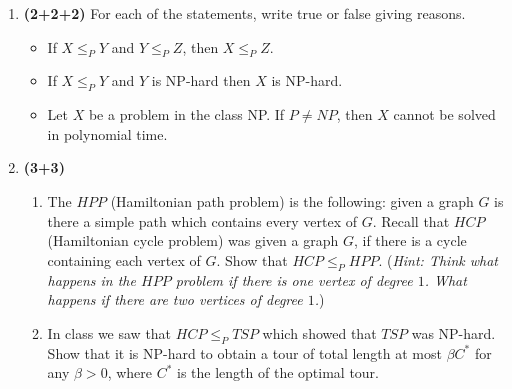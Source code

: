 \documentclass[10pt]{article}
\begin{document}
\begin{enumerate}
\item {\bf (2+2+2)}
For each of the statements, write true or false giving reasons.
\begin{itemize}
\item If $X\le_P Y$ and $Y\le_P Z$, then $X\le_P Z$. 
\item If $X \le_P Y$ and $Y$ is NP-hard then $X$ is NP-hard.
\item Let $X$ be a problem in the class NP. If $P\neq NP$, then $X$ cannot be solved in polynomial time.
\end{itemize}

\item {\bf (3+3)}
\begin{enumerate}
\item The $HPP$ (Hamiltonian path problem) is the following: given a graph $G$ is there a simple path which contains every vertex of $G$. 
Recall that $HCP$ (Hamiltonian cycle problem) was given a graph $G$, if there is a cycle containing each vertex of $G$.
Show that $HCP \le_P HPP$. ({\em Hint: Think what happens in the $HPP$ problem if there is one vertex of degree $1$. What happens if there are two vertices of degree $1$.})
\item In class we saw that $HCP \le_P TSP$ which showed that $TSP$ was NP-hard. Show that it is NP-hard to obtain a tour of total length at most $\beta C^*$ for any $\beta > 0$, where $C^*$ is the length of the optimal tour.
\end{enumerate}


\end{enumerate}
\end{document}
